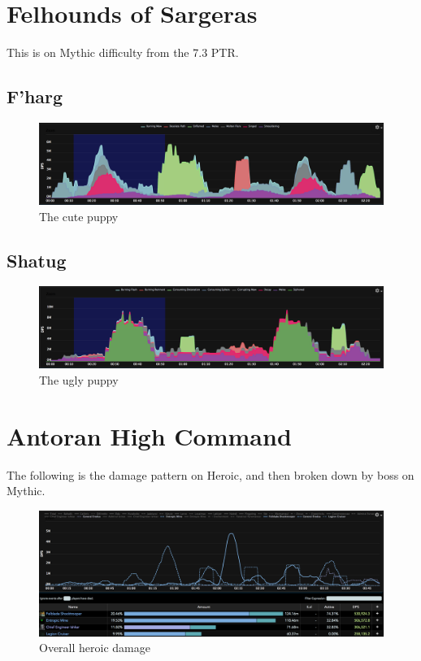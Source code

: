 \documentclass{article}
\begin{document}
\newpage
\section{Felhounds of Sargeras}

This is on Mythic difficulty from the 7.3 PTR.

\subsection{F'harg}

\begin{figure}[!htb]
  \includegraphics[width=\linewidth]{02-fharg-mythic.png}
  \caption{The cute puppy}
  \label{fig:dmg2}
\end{figure}

\subsection{Shatug}

\begin{figure}[!htb]
  \includegraphics[width=\linewidth]{02-shatug-mythic.png}
  \caption{The ugly puppy}
  \label{fig:dmg2}
\end{figure}


\newpage
\section{Antoran High Command}

The following is the damage pattern on Heroic, and then broken down by boss on Mythic.

\begin{figure}[!htb]
  \includegraphics[width=\linewidth]{03-highcommand.png}
  \caption{Overall heroic damage}
  \label{fig:dmg3}
\end{figure}
\end{document}
